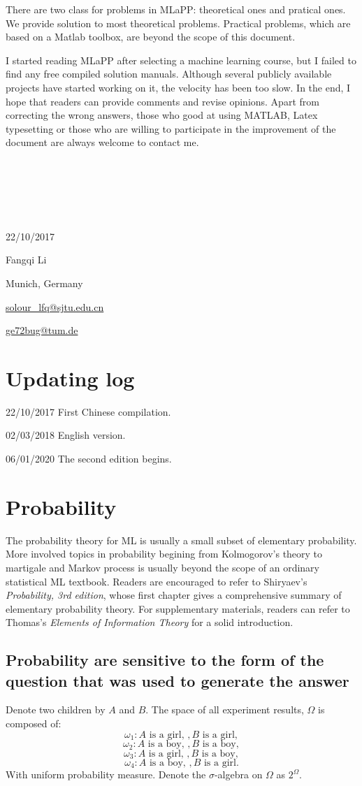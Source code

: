 \documentclass[UTF8]{ctexart}
\begin{document}
There are two class for problems in MLaPP: theoretical ones and pratical ones. 
We provide solution to most theoretical problems. 
Practical problems, which are based on a Matlab toolbox, are beyond the scope of this document.

I started reading MLaPP after selecting a machine learning course, but I failed to find any free compiled solution manuals. 
Although several publicly available projects have started working on it, the velocity has been too slow. 
In the end, I hope that readers can provide comments and revise opinions. Apart from correcting the wrong answers, those who good at using MATLAB, Latex typesetting or those who are willing to participate in the improvement of the document are always welcome to contact me.

\ 

\ 

\ 

22/10/2017

Fangqi Li

Munich, Germany

\url{solour_lfq@sjtu.edu.cn}

\url{ge72bug@tum.de}

\newpage
\section{Updating log}
22/10/2017 First Chinese compilation.

02/03/2018 English version.

06/01/2020 The second edition begins.

\newpage
\section{Probability}
The probability theory for ML is usually a small subset of elementary probability. 
More involved topics in probability begining from Kolmogorov's theory to martigale and Markov process is usually beyond the scope of an ordinary statistical ML textbook. 
Readers are encouraged to refer to Shiryaev's \emph{Probability, 3rd edition}, whose first chapter gives a comprehensive summary of elementary probability theory. 
For supplementary materials, readers can refer to Thomas's \emph{Elements of Information Theory} for a solid introduction. 

\subsection{Probability are sensitive to the form of the question that was used to generate the answer}
Denote two children by $A$ and $B$.
The space of all experiment results, $\Omega$ is composed of:
$$\omega_{1}:A\text{ is a girl, },B\text{ is a girl},$$
$$\omega_{2}:A\text{ is a boy, },B\text{ is a boy},$$
$$\omega_{3}:A\text{ is a girl, },B\text{ is a boy},$$
$$\omega_{4}:A\text{ is a boy, },B\text{ is a girl}.$$
With uniform probability measure. 
Denote the $\sigma$-algebra on $\Omega$ as $2^{\Omega}$. 
\end{document}
